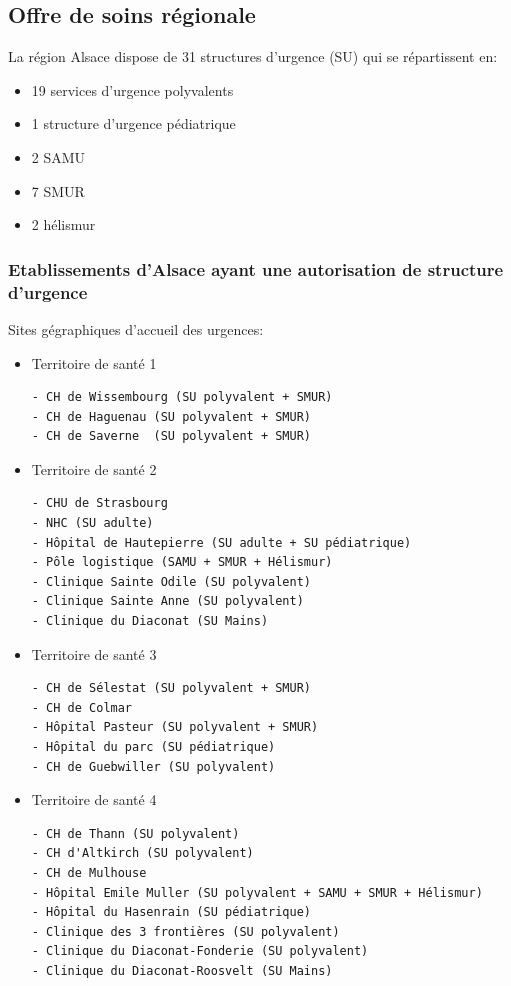 \documentclass[]{article}
\begin{document}
\subsection{Offre de soins régionale}\label{offre-de-soins-regionale}

La région Alsace dispose de 31 structures d'urgence (SU) qui se
répartissent en:

\begin{itemize}
\itemsep1pt\parskip0pt
\item
  19 services d'urgence polyvalents
\item
  1 structure d'urgence pédiatrique
\item
  2 SAMU
\item
  7 SMUR
\item
  2 hélismur
\end{itemize}

\subsubsection{Etablissements d'Alsace ayant une autorisation de
structure
d'urgence}\label{etablissements-dalsace-ayant-une-autorisation-de-structure-durgence}

Sites gégraphiques d'accueil des urgences:

\begin{itemize}
\item
  Territoire de santé 1

\begin{verbatim}
- CH de Wissembourg (SU polyvalent + SMUR)
- CH de Haguenau (SU polyvalent + SMUR)
- CH de Saverne  (SU polyvalent + SMUR)
\end{verbatim}
\item
  Territoire de santé 2

\begin{verbatim}
- CHU de Strasbourg
- NHC (SU adulte)
- Hôpital de Hautepierre (SU adulte + SU pédiatrique)
- Pôle logistique (SAMU + SMUR + Hélismur)
- Clinique Sainte Odile (SU polyvalent)
- Clinique Sainte Anne (SU polyvalent)
- Clinique du Diaconat (SU Mains)
\end{verbatim}
\item
  Territoire de santé 3

\begin{verbatim}
- CH de Sélestat (SU polyvalent + SMUR)
- CH de Colmar 
- Hôpital Pasteur (SU polyvalent + SMUR)
- Hôpital du parc (SU pédiatrique)
- CH de Guebwiller (SU polyvalent)
\end{verbatim}
\item
  Territoire de santé 4

\begin{verbatim}
- CH de Thann (SU polyvalent)
- CH d'Altkirch (SU polyvalent)
- CH de Mulhouse
- Hôpital Emile Muller (SU polyvalent + SAMU + SMUR + Hélismur)
- Hôpital du Hasenrain (SU pédiatrique)
- Clinique des 3 frontières (SU polyvalent)
- Clinique du Diaconat-Fonderie (SU polyvalent)
- Clinique du Diaconat-Roosvelt (SU Mains)
\end{verbatim}
\end{itemize}
\end{document}
